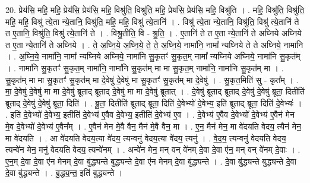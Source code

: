 \documentclass[17pt]{extarticle}
\begin{document}
20. प्रेय॑सि॒ महि॒ महि॒ प्रेय॑सि॒ प्रेय॑सि॒ महि॒ विश्रु॑ति॒ विश्रु॑ति॒ महि॒ प्रेय॑सि॒ प्रेय॑सि॒ महि॒ विश्रु॑ति । . महि॒ विश्रु॑ति॒ विश्रु॑ति॒ महि॒ महि॒ विश्रु॑ त्ये॒ता न्ये॒तानि॒ विश्रु॑ति॒ महि॒ महि॒ विश्रु॑ त्ये॒तानि॑ । . विश्रु॑ त्ये॒ता न्ये॒तानि॒ विश्रु॑ति॒ विश्रु॑ त्ये॒तानि॑ ते त ए॒तानि॒ विश्रु॑ति॒ विश्रु॑ त्ये॒तानि॑ ते । . विश्रु॒तीति॒ वि - श्रु॒ति॒ । . ए॒तानि॑ ते त ए॒ता न्ये॒तानि॑ ते अघ्निये अघ्निये त ए॒ता न्ये॒तानि॑ ते अघ्निये । . ते॒ अ॒घ्नि॒ये॒ अ॒घ्नि॒ये॒ ते॒ ते॒ अ॒घ्नि॒ये॒ नामा॑नि॒ नामा᳚ न्यघ्निये ते ते अघ्निये॒ नामा॑नि । . अ॒घ्नि॒ये॒ नामा॑नि॒ नामा᳚ न्यघ्निये अघ्निये॒ नामा॑नि सु॒कृतꣳ॑ सु॒कृत॒म् नामा᳚ न्यघ्निये अघ्निये॒ नामा॑नि सु॒कृत᳚म् । . नामा॑नि सु॒कृतꣳ॑ सु॒कृत॒म् नामा॑नि॒ नामा॑नि सु॒कृत॑म् मा मा सु॒कृत॒म् नामा॑नि॒ नामा॑नि सु॒कृत॑म् मा । . सु॒कृत॑म् मा मा सु॒कृतꣳ॑ सु॒कृत॑म् मा दे॒वेषु॑ दे॒वेषु॑ मा सु॒कृतꣳ॑ सु॒कृत॑म् मा दे॒वेषु॑ । . सु॒कृत॒मिति॑ सु - कृत᳚म् । . मा॒ दे॒वेषु॑ दे॒वेषु॑ मा मा दे॒वेषु॑ ब्रूताद् ब्रूताद् दे॒वेषु॑ मा मा दे॒वेषु॑ ब्रूतात् । . दे॒वेषु॑ ब्रूताद् ब्रूताद् दे॒वेषु॑ दे॒वेषु॑ ब्रूता॒ दितीति॑ ब्रूताद् दे॒वेषु॑ दे॒वेषु॑ ब्रूता॒ दिति॑ । . ब्रू॒ता॒ दितीति॑ ब्रूताद् ब्रूता॒ दिति॑ दे॒वेभ्यो॑ दे॒वेभ्य॒ इति॑ ब्रूताद् ब्रूता॒ दिति॑ दे॒वेभ्यः॑ । . इति॑ दे॒वेभ्यो॑ दे॒वेभ्य॒ इतीति॑ दे॒वेभ्य॑ ए॒वैव दे॒वेभ्य॒ इतीति॑ दे॒वेभ्य॑ ए॒व । . दे॒वेभ्य॑ ए॒वैव दे॒वेभ्यो॑ दे॒वेभ्य॑ ए॒वैन॑ मेन मे॒व दे॒वेभ्यो॑ दे॒वेभ्य॑ ए॒वैन᳚म् । . ए॒वैन॑ मेन मे॒वै वैन॒ मैन॑ मे॒वै वैन॒ मा । . ए॒न॒ मैन॑ मेन॒ मा वे॑दयति वेदय॒ त्यैन॑ मेन॒ मा वे॑दयति । . आ वे॑दयति वेदय॒त्या वे॑दय॒ त्यन्वनु॑ वेदय॒त्या वे॑दय॒ त्यनु॑ । . वे॒द॒य॒ त्यन्वनु॑ वेदयति वेदय॒ त्यन्वे॑न मेन॒ मनु॑ वेदयति वेदय॒ त्यन्वे॑नम् । . अन्वे॑न मेन॒ मन् वन् वे॑नम् दे॒वा दे॒वा ए॑न॒ मन् वन् वे॑नम् दे॒वाः । . ए॒न॒म् दे॒वा दे॒वा ए॑न मेनम् दे॒वा बु॑द्ध्यन्ते बुद्ध्यन्ते दे॒वा ए॑न मेनम् दे॒वा बु॑द्ध्यन्ते । . दे॒वा बु॑द्ध्यन्ते बुद्ध्यन्ते दे॒वा दे॒वा बु॑द्ध्यन्ते । . बु॒द्ध्य॒न्त॒ इति॑ बुद्ध्यन्ते । \newline
\pagebreak
{}
\end{document}
